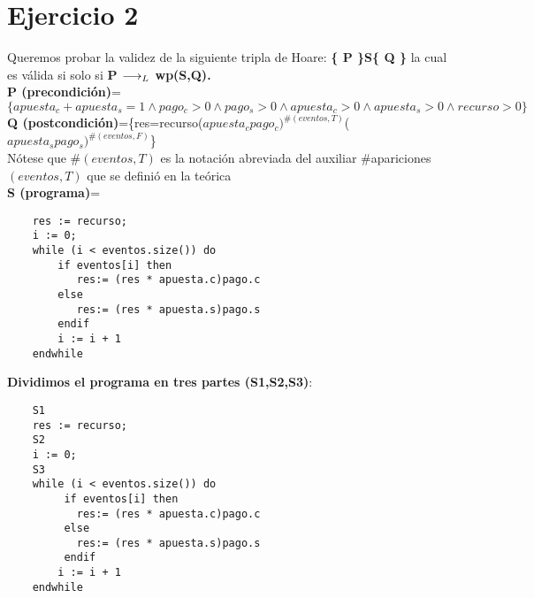 \documentclass[10pt,a4paper]{article}
\begin{document}
\section{Ejercicio 2}
\begin{flushleft}
Queremos probar  la validez de la siguiente tripla de Hoare:
\textbf{\{ P \}S\{ Q \}} la cual es válida si solo si \textbf{{P $\longrightarrow _L$ wp(S,Q)}.}\\                                  
\vspace{3mm}
\textbf{P (precondición)}=$\{ apuesta_c + apuesta_s =1 \wedge pago_c>0 \wedge pago_s>0 \wedge apuesta_c>0 \wedge apuesta_s>0 \wedge recurso>0\}$\\
\vspace{3mm}
\textbf{Q (postcondición)}=\{res=recurso($apuesta_cpago_c)^{\#(eventos,T)}$($apuesta_spago_s)^{\#(eventos,F)}$\}\\
\vspace{3mm}
Nótese que \#$(eventos, T)$ es la notación abreviada del auxiliar {\normalfont\ttfamily\#apariciones$(eventos, T)$} 
que se definió en la teórica \\
\vspace{34mm}
\textbf{S (programa)}=
\begin{lstlisting}
	res := recurso;
	i := 0;
	while (i < eventos.size()) do
	    if eventos[i] then
		   res:= (res * apuesta.c)pago.c
		else
		   res:= (res * apuesta.s)pago.s
		endif
		i := i + 1
	endwhile
\end{lstlisting} 

\vspace{3mm}
\textbf{Dividimos el programa en tres partes (S1,S2,S3)}:\\
\begin{lstlisting}
	S1
	res := recurso;
	S2
	i := 0;
	S3
	while (i < eventos.size()) do
	     if eventos[i] then
		   res:= (res * apuesta.c)pago.c
		 else
		   res:= (res * apuesta.s)pago.s
		 endif
		i := i + 1
	endwhile
		\end{lstlisting} 


\end{flushleft}
\end{document}
